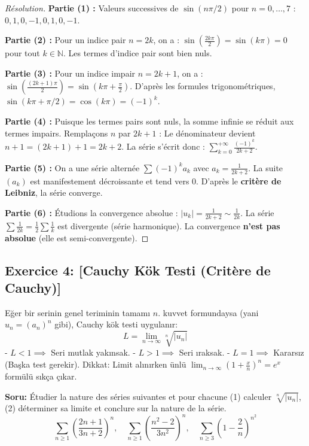 \documentclass[12pt,a4paper]{report}
\begin{document}
\begin{proof}[Résolution]
\textbf{Partie (1) :} Valeurs successives de $\sin(n\pi/2)$ pour $n = 0, \dots, 7$ :
$0, 1, 0, -1, 0, 1, 0, -1$.

\textbf{Partie (2) :} Pour un indice pair $n = 2k$, on a :
$\sin\left(\frac{2k\pi}{2}\right) = \sin(k\pi) = 0$ pour tout $k \in \mathbb{N}$. Les termes d'indice pair sont bien nuls.

\textbf{Partie (3) :} Pour un indice impair $n = 2k + 1$, on a :
$\sin\left(\frac{(2k+1)\pi}{2}\right) = \sin\left(k\pi + \frac{\pi}{2}\right)$.
D'après les formules trigonométriques, $\sin(k\pi + \pi/2) = \cos(k\pi) = (-1)^k$.

\textbf{Partie (4) :} Puisque les termes pairs sont nuls, la somme infinie se réduit aux termes impairs. Remplaçons $n$ par $2k+1$ :
Le dénominateur devient $n+1 = (2k+1)+1 = 2k+2$.
La série s'écrit donc : $\sum_{k=0}^{+\infty} \frac{(-1)^k}{2k+2}$.

\textbf{Partie (5) :} On a une série alternée $\sum (-1)^k a_k$ avec $a_k = \frac{1}{2k+2}$.
La suite $(a_k)$ est manifestement décroissante et tend vers 0. D'après le \textbf{critère de Leibniz}, la série converge.

\textbf{Partie (6) :} Étudions la convergence absolue :
$|u_k| = \frac{1}{2k+2} \sim \frac{1}{2k}$.
La série $\sum \frac{1}{2k} = \frac{1}{2} \sum \frac{1}{k}$ est divergente (série harmonique). La convergence \textbf{n'est pas absolue} (elle est semi-convergente).
\end{proof}

\subsection*{Exercice 4: [Cauchy Kök Testi (Critère de Cauchy)]}

\begin{tcolorbox}[colback=teal!5!white,colframe=teal!75!black,title=Hatırlatma (Rappel): Cauchy Kök Testi (Critère de Cauchy)]
Eğer bir serinin genel teriminin tamamı $n$. kuvvet formundaysa (yani $u_n = (a_n)^n$ gibi), Cauchy kök testi uygulanır:
\[ L = \lim_{n \to \infty} \sqrt[n]{|u_n|} \]
- $L < 1 \implies$ Seri mutlak yakınsak.
- $L > 1 \implies$ Seri ıraksak.
- $L = 1 \implies$ Kararsız (Başka test gerekir).
Dikkat: Limit alınırken ünlü $\lim_{n \to \infty} \left(1 + \frac{x}{n}\right)^n = e^x$ formülü sıkça çıkar.
\end{tcolorbox}

\textbf{Soru:}
Étudier la nature des séries suivantes et pour chacune (1) calculer $\sqrt[n]{|u_n|}$, (2) déterminer sa limite et conclure sur la nature de la série.
\[ \sum_{n \ge 1} \left( \frac{2n+1}{3n+2} \right)^n, \quad \sum_{n \ge 1} \left( \frac{n^2-2}{3n^2} \right)^n, \quad \sum_{n \ge 3} \left( 1 - \frac{2}{n} \right)^{n^2} \]
\end{document}
